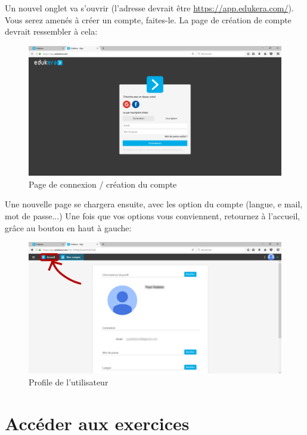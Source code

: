 \documentclass[a4paper]{article}
\begin{document}
Un nouvel onglet va s'ouvrir (l'adresse devrait être \url{https://app.edukera.com/}). Vous serez amenés à créer un compte, faites-le. La page de création de compte devrait ressembler à cela:
\begin{figure}
\begin{center}
\includegraphics[scale=0.1]{img_app0.png}
\end{center}
\caption{Page de connexion / création du compte}\label{im:page_connexion}
\end{figure}
\FloatBarrier

Une nouvelle page se chargera ensuite, avec les option du compte (langue, e mail, mot de passe...)
Une fois que vos options vous conviennent, retournez à l'accueil, grâce au bouton en haut à gauche:
\begin{figure}[h!]
\begin{center}
\includegraphics[scale=0.1]{img_app1.png}
\end{center}
\caption{Profile de l'utilisateur}\label{im:profile_utilisateur}
\end{figure}
\FloatBarrier



\section{Accéder aux exercices}
\end{document}
